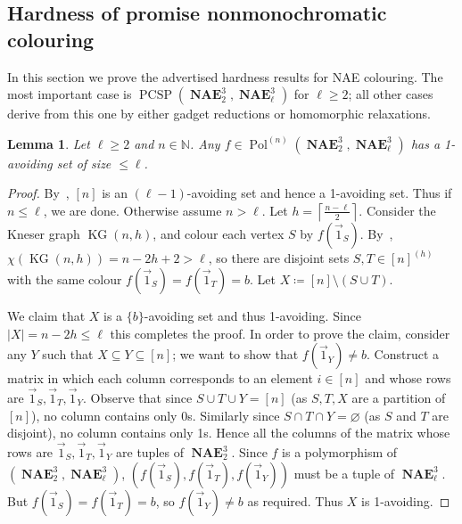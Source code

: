 \documentclass[a4paper,11pt]{article}
\renewcommand\emptyset\varnothing
\newcommand{\2}{\vec{2}}
\newcommand{\1}{\vec{1}}
\newcommand{\0}{\vec{0}}
\DeclareMathOperator{\KG}{KG}
\DeclareMathOperator{\PCSP}{PCSP}
\DeclareMathOperator{\Pol}{Pol}
\DeclareMathOperator{\NAE}{\mathbf{NAE}}
\theoremstyle{plain}
\newtheorem{lemma}[theorem]{Lemma}
\theoremstyle{definition}
\begin{document}
\subsection{Hardness of promise nonmonochromatic colouring}

In this section we prove the advertised hardness results for NAE colouring. The most important case is $\PCSP(\NAE_2^3, \NAE_\ell^3)$ for $\ell \geq 2$; all other cases derive from this one by either gadget reductions or homomorphic relaxations.

\begin{lemma}\label{lem:lem1}
	Let $\ell \geq 2$ and $n \in \mathbb{N}$.
    Any $f \in \Pol^{(n)}(\NAE_2^3, \NAE_\ell^3)$ has a 1-avoiding set of size $ \leq \ell$.
\end{lemma}
\begin{proof}
  By~, $[n]$ is an $(\ell-1)$-avoiding set and hence a 1-avoiding set. Thus if $n\leq\ell$, we are done.
	Otherwise assume $n > \ell$.
	Let $h = \left\lceil \frac{n-\ell}{2}\right\rceil$.
	Consider the Kneser graph $\KG(n,h)$, and colour each vertex $S$ by $f(\1_S)$.
	By~, $\chi(\KG(n,h))=n-2h+2 > \ell$, so
	there are disjoint sets $S,T \in [n]^{(h)}$ with the same colour $f(\1_S)=f(\1_T) = b$.
	Let $X \coloneq [n] \setminus (S \cup T)$.
    
    We claim that $X$ is a $\{b\}$-avoiding set and thus 1-avoiding.
    Since $|X| = n - 2h \leq \ell$ this completes the proof.
In order to prove the claim, consider any $Y$ such that $X \subseteq Y
    \subseteq [n]$; we want to show that $f(\1_Y) \neq b$. Construct a matrix in
    which each column corresponds to an element $i\in [n]$ and 
    whose rows are $\1_S, \1_T, \1_Y$. 
    Observe that since $S \cup T \cup Y = [n]$ (as $S, T, X$ are a
    partition of $[n]$), no column contains only 0s. Similarly since $S \cap T
    \cap Y = \emptyset$ (as $S$ and $T$ are disjoint), no column contains only
    1s. Hence all the columns of the matrix whose rows are $\1_S, \1_T, \1_Y$
    are tuples of $\NAE_2^3$. Since $f$ is a polymorphism of
    $(\NAE_2^3,\NAE_\ell^3)$, 
    $(f(\1_S), f(\1_T), f(\1_Y))$ must be a tuple of $\NAE_\ell^3$. But $f(\1_S) = f(\1_T) = b$, so $f(\1_Y) \neq b$ as required.
	  Thus $X$ is 1-avoiding. 
\end{proof}
\end{document}
